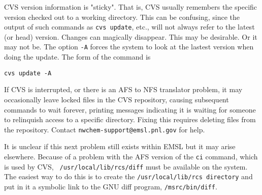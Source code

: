 CVS version information is 
"sticky".  That is, CVS usually remembers the specific version checked out
to a working directory.  This can be confusing, 
since the output of such commands as \texttt{cvs update}, etc., will not 
always refer to the latest (or
head) version.  Changes can magically
disappear.  This may be desirable. Or it may not be.  The option \texttt{-A} 
forces the system to look at the lastest version when doing the update.
The form of the command is

\begin{verbatim}
cvs update -A
\end{verbatim}

If CVS is interrupted, or there is an AFS to NFS translator problem,
it may occasionally leave locked files in the CVS repository, causing
subsequent commands to wait forever, printing messages indicating it is
waiting for someone to relinquish access to a specific directory.
Fixing this requires deleting files from the repository.
Contact {\tt nwchem-support@emsl.pnl.gov} for help.

It is unclear if this next problem still exists within EMSL but it may
arise elsewhere.  Because of a problem with the AFS version of the {\tt ci}
command, which is used by CVS, {\tt
  /usr/local/lib/rcs/diff} must be available on the system.  
The easiest way to do this
is to create the {\tt /usr/local/lib/rcs directory} and put in it a
symbolic link to the GNU diff program, {\tt /msrc/bin/diff}.
